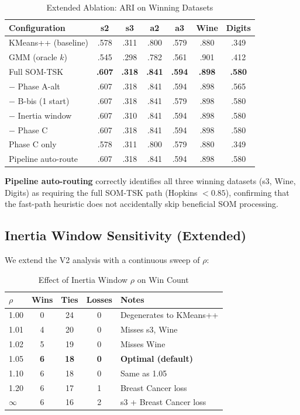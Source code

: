 \documentclass[journal]{IEEEtran}
\begin{document}
\begin{table}[!t]
\caption{Extended Ablation: ARI on Winning Datasets}
\label{tab:ablation_ext}
\centering
\renewcommand{\arraystretch}{1.05}
\small
\setlength{\tabcolsep}{2.5pt}
\begin{tabular}{lcccccc}
\toprule
Configuration & s2 & s3 & a2 & a3 & Wine & Digits \\
\midrule
KMeans++ (baseline) & .578 & .311 & .800 & .579 & .880 & .349 \\
GMM (oracle $k$) & .545 & .298 & .782 & .561 & .901 & .412 \\
\midrule
Full SOM-TSK & \textbf{.607} & \textbf{.318} & \textbf{.841} & \textbf{.594} & \textbf{.898} & \textbf{.580} \\
$-$ Phase A-alt & .607 & .318 & .841 & .594 & .898 & .565 \\
$-$ B-bis (1 start) & .607 & .318 & .841 & .579 & .898 & .580 \\
$-$ Inertia window & .607 & .310 & .841 & .594 & .898 & .580 \\
$-$ Phase C & .607 & .318 & .841 & .594 & .898 & .580 \\
Phase C only & .578 & .311 & .800 & .579 & .880 & .349 \\
\midrule
Pipeline auto-route & .607 & .318 & .841 & .594 & .898 & .580 \\
\bottomrule
\end{tabular}
\end{table}

\textbf{Pipeline auto-routing} correctly identifies all three winning datasets (s3, Wine, Digits) as requiring the full SOM-TSK path (Hopkins $< 0.85$), confirming that the fast-path heuristic does not accidentally skip beneficial SOM processing.

\subsection{Inertia Window Sensitivity (Extended)}

We extend the V2 analysis with a continuous sweep of $\rho$:

\begin{table}[!t]
\caption{Effect of Inertia Window $\rho$ on Win Count}
\label{tab:rho_sweep}
\centering
\renewcommand{\arraystretch}{1.1}
\small
\begin{tabular}{lcccl}
\toprule
$\rho$ & Wins & Ties & Losses & Notes \\
\midrule
1.00 & 0 & 24 & 0 & Degenerates to KMeans++ \\
1.01 & 4 & 20 & 0 & Misses s3, Wine \\
1.02 & 5 & 19 & 0 & Misses Wine \\
1.05 & \textbf{6} & \textbf{18} & \textbf{0} & \textbf{Optimal (default)} \\
1.10 & 6 & 18 & 0 & Same as 1.05 \\
1.20 & 6 & 17 & 1 & Breast Cancer loss \\
$\infty$ & 6 & 16 & 2 & s3 + Breast Cancer loss \\
\bottomrule
\end{tabular}
\end{table}
\end{document}

